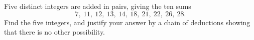 Five distinct integers are added in pairs, giving the ten sums
\[
7,\ 11,\ 12,\ 13,\ 14,\ 18,\ 21,\ 22,\ 26,\ 28 .
\]
Find the five integers, and justify your answer by a chain of deductions showing that there is no other possibility.
